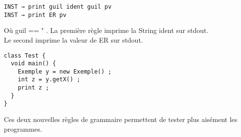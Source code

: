 \begin{verbatim}
INST → print guil ident guil pv
INST → print ER pv
\end{verbatim}

Où guil == " .
La première règle imprime la String ident sur stdout.\\
Le second imprime la valeur de ER sur stdout.\\

\begin{verbatim}
class Test {
  void main() {
    Exemple y = new Exemple() ;
    int z = y.getX() ;
    print z ;
  }
}
\end{verbatim}

Ces deux nouvelles règles de grammaire permettent de tester plus aisément les
programmes.\\


